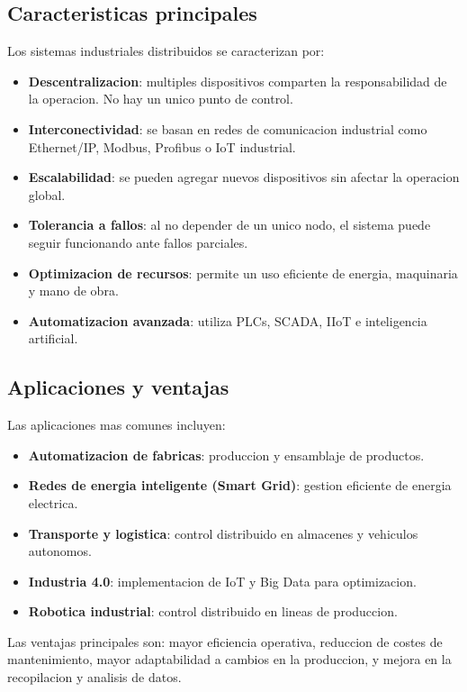 \subsection{Caracteristicas principales}

Los sistemas industriales distribuidos se caracterizan por:

\begin{itemize}
    \item \textbf{Descentralizacion}: multiples dispositivos comparten la
    responsabilidad de la operacion. No hay un unico punto de control.
    \item \textbf{Interconectividad}: se basan en redes de comunicacion industrial
    como Ethernet/IP, Modbus, Profibus o IoT industrial.
    \item \textbf{Escalabilidad}: se pueden agregar nuevos dispositivos sin afectar
    la operacion global.
    \item \textbf{Tolerancia a fallos}: al no depender de un unico nodo, el sistema
    puede seguir funcionando ante fallos parciales.
    \item \textbf{Optimizacion de recursos}: permite un uso eficiente de energia,
    maquinaria y mano de obra.
    \item \textbf{Automatizacion avanzada}: utiliza PLCs, SCADA, IIoT e inteligencia
    artificial.
\end{itemize}

\subsection{Aplicaciones y ventajas}

Las aplicaciones mas comunes incluyen:
\begin{itemize}
    \item \textbf{Automatizacion de fabricas}: produccion y ensamblaje de productos.
    \item \textbf{Redes de energia inteligente (Smart Grid)}: gestion eficiente de
    energia electrica.
    \item \textbf{Transporte y logistica}: control distribuido en almacenes y vehiculos
    autonomos.
    \item \textbf{Industria 4.0}: implementacion de IoT y Big Data para optimizacion.
    \item \textbf{Robotica industrial}: control distribuido en lineas de produccion.
\end{itemize}

Las ventajas principales son: mayor eficiencia operativa, reduccion de costes de
mantenimiento, mayor adaptabilidad a cambios en la produccion, y mejora en la
recopilacion y analisis de datos.


